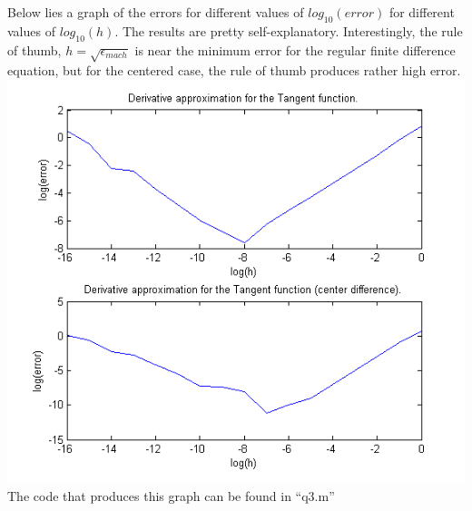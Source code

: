\documentclass[paper=a4, fontsize=11pt]{scrartcl} %
\numberwithin{equation}{section} %
\numberwithin{figure}{section} %
\numberwithin{table}{section} %
\begin{document}
Below lies a graph of the errors for different values of $log_{10}(error)$ for different values of $log_{10}(h)$. The results are pretty self-explanatory. Interestingly, the rule of thumb, $h = \sqrt{\epsilon_{mach}}$ is near the minimum error for the regular finite difference equation, but for the centered case, the rule of thumb produces rather high error. \\
\includegraphics{derivativeGraph} \\
The code that produces this graph can be found in ``q3.m''


\end{document}
